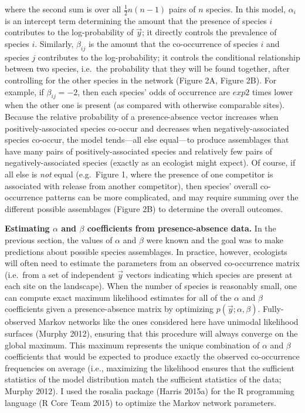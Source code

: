 \documentclass[12pt,]{article}
\begin{document}
\begin{spacing}{1.9}
\begin{flushleft}
\noindent where the second sum is over all \(\frac{1}{2}n(n-1)\) pairs
of \(n\) species. In this model, \(\alpha_{i}\) is an intercept term
determining the amount that the presence of species \(i\) contributes to
the log-probability of \(\vec{y}\); it directly controls the prevalence
of species \(i\). Similarly, \(\beta_{ij}\) is the amount that the
co-occurrence of species \(i\) and species \(j\) contributes to the
log-probability; it controls the conditional relationship between two
species, i.e.~the probability that they will be found together, after
controlling for the other species in the network (Figure 2A, Figure 2B).
For example, if \(\beta_{ij} = -2\), then each species' odds of
occurrence are \(exp{2}\) times lower when the other one is present (as
compared with otherwise comparable sites). Because the relative
probability of a presence-absence vector increases when
positively-associated species co-occur and decreases when
negatively-associated species co-occur, the model tends---all else
equal---to produce assemblages that have many pairs of
positively-associated species and relatively few pairs of
negatively-associated species (exactly as an ecologist might expect). Of
course, if all else is \emph{not} equal (e.g.~Figure 1, where the
presence of one competitor is associated with release from another
competitor), then species' overall co-occurrence patterns can be more
complicated, and may require summing over the different possible
assemblages (Figure 2B) to determine the overall outcomes.

\noindent \textbf{Estimating $\alpha$ and $\beta$ coefficients from presence-absence data.}
In the previous section, the values of \(\alpha\) and \(\beta\) were
known and the goal was to make predictions about possible species
assemblages. In practice, however, ecologists will often need to
estimate the parameters from an observed co-occurrence matrix (i.e.~from
a set of independent \(\vec{y}\) vectors indicating which species are
present at each site on the landscape). When the number of species is
reasonably small, one can compute exact maximum likelihood estimates for
all of the \(\alpha\) and \(\beta\) coefficients given a
presence-absence matrix by optimizing \(p(\vec{y}; \alpha, \beta)\).
Fully-observed Markov networks like the ones considered here have
unimodal likelihood surfaces (Murphy 2012), ensuring that this procedure
will always converge on the global maximum. This maximum represents the
unique combination of \(\alpha\) and \(\beta\) coefficients that would
be expected to produce exactly the observed co-occurrence frequencies on
average (i.e., maximizing the likelihood ensures that the sufficient
statistics of the model distribution match the sufficient statistics of
the data; Murphy 2012). I used the rosalia package (Harris 2015a) for
the R programming language (R Core Team 2015) to optimize the Markov
network parameters.


\end{flushleft}
\end{spacing}
\end{document}
